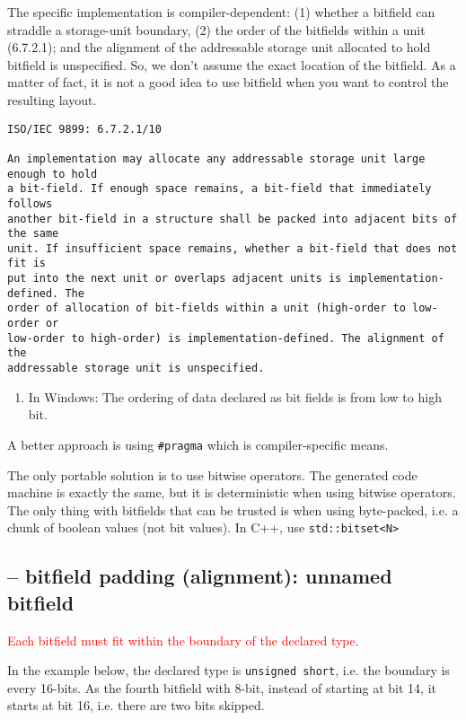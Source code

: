 The specific implementation is compiler-dependent: (1) whether a bitfield can
straddle a storage-unit boundary, (2) the order of the bitfields within a unit
(6.7.2.1); and the alignment of the addressable storage unit allocated to hold
bitfield is unspecified. So, we don't assume the exact location of the bitfield.
As a matter of fact, it is not a good idea to use bitfield when you want to
control the resulting layout.
{\small 
\begin{verbatim}
ISO/IEC 9899: 6.7.2.1/10

An implementation may allocate any addressable storage unit large enough to hold
a bit-field. If enough space remains, a bit-field that immediately follows
another bit-field in a structure shall be packed into adjacent bits of the same
unit. If insufficient space remains, whether a bit-field that does not fit is
put into the next unit or overlaps adjacent units is implementation-defined. The
order of allocation of bit-fields within a unit (high-order to low-order or
low-order to high-order) is implementation-defined. The alignment of the
addressable storage unit is unspecified.     
\end{verbatim}
}
\begin{enumerate}
  \item In Windows: The ordering of data declared as bit fields is from low to
  high bit.
  
\end{enumerate}

A better approach is using \verb!#pragma! which is compiler-specific means.

The only portable solution is to use bitwise operators. The generated code
machine is exactly the same, but it is deterministic when using bitwise
operators. The only thing with bitfields that can be trusted is when using
byte-packed, i.e. a chunk of boolean values (not bit values). In C++, use
\verb!std::bitset<N>!


\subsection{-- bitfield padding (alignment): unnamed bitfield}
\label{sec:bitfield-padding} 
\label{sec:bitfield-unnamed-bitfield}

\textcolor{red}{Each bitfield must fit within the boundary of the declared
type}.

In the example below, the declared type is \verb!unsigned short!, i.e. the
boundary is every 16-bits. As the fourth bitfield with 8-bit, instead of
starting at bit 14, it starts at bit 16, i.e. there are two bits skipped.

